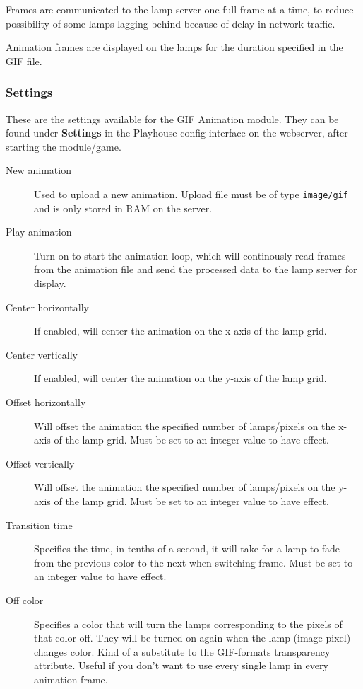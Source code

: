 Frames are communicated to the lamp server one full frame at a time, to reduce possibility of some lamps lagging behind because of delay in network traffic.

Animation frames are displayed on the lamps for the duration specified in the GIF file.

\subsubsection{Settings}

These are the settings available for the GIF Animation module. They can be found
under \textbf{Settings} in the Playhouse config interface on the webserver, after
starting the module/game.

\begin{description}
    \item[New animation]
Used to upload a new animation. Upload file must be of type \texttt{image/gif}
and is only stored in RAM on the server.

    \item[Play animation]
Turn on to start the animation loop, which will continously read frames from
the animation file and send the processed data to the lamp server for display.

    \item[Center horizontally]
If enabled, will center the animation on the x-axis of the lamp grid.

    \item[Center vertically]
If enabled, will center the animation on the y-axis of the lamp grid.

    \item[Offset horizontally]
Will offset the animation the specified number of lamps/pixels on the x-axis
of the lamp grid. Must be set to an integer value to have effect.

    \item[Offset vertically]
Will offset the animation the specified number of lamps/pixels on the y-axis
of the lamp grid. Must be set to an integer value to have effect.

    \item[Transition time]
Specifies the time, in tenths of a second, it will take for a lamp to fade from
the previous color to the next when switching frame. Must be set to an integer
value to have effect.

    \item[Off color]
Specifies a color that will turn the lamps corresponding to the pixels of that
color off. They will be turned on again when the lamp (image pixel) changes
color. Kind of a substitute to the GIF-formats transparency attribute.
Useful if you don't want to use every single lamp in every animation frame.
\end{description}


